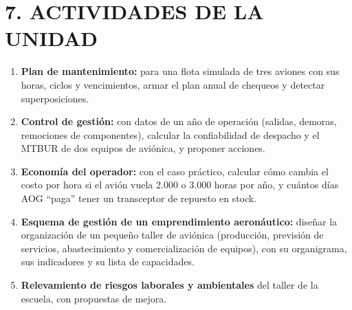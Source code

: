 \section*{7. ACTIVIDADES DE LA UNIDAD}
\begin{enumerate}
  \item \textbf{Plan de mantenimiento:} para una flota simulada de tres aviones con sus horas, ciclos
        y vencimientos, armar el plan anual de chequeos y detectar superposiciones.
  \item \textbf{Control de gestión:} con datos de un año de operación (salidas, demoras, remociones
        de componentes), calcular la confiabilidad de despacho y el MTBUR de dos equipos de
        aviónica, y proponer acciones.
  \item \textbf{Economía del operador:} con el caso práctico, calcular cómo cambia el costo por
        hora si el avión vuela 2.000 o 3.000 horas por año, y cuántos días AOG ``paga'' tener un
        transceptor de repuesto en stock.
  \item \textbf{Esquema de gestión de un emprendimiento aeronáutico:} diseñar la organización de un
        pequeño taller de aviónica (producción, previsión de servicios, abastecimiento y
        comercialización de equipos), con su organigrama, sus indicadores y su lista de
        capacidades.
  \item \textbf{Relevamiento de riesgos laborales y ambientales} del taller de la escuela, con
        propuestas de mejora.
\end{enumerate}
